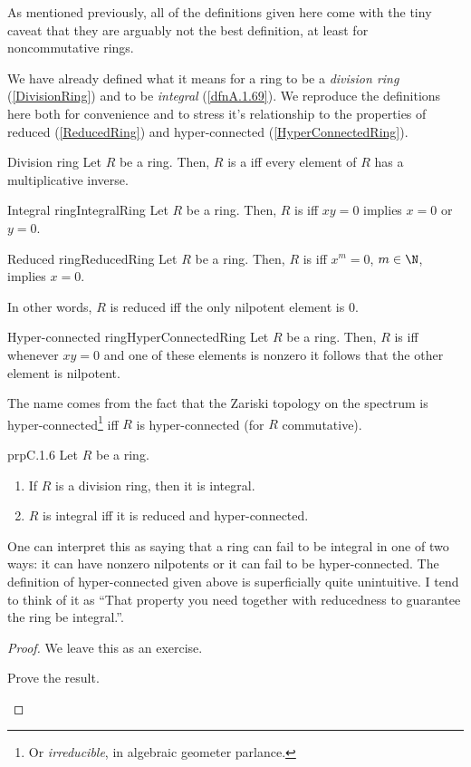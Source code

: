 As mentioned previously, all of the definitions given here come with the tiny caveat that they are arguably not the best definition, at least for noncommutative rings.

We have already defined what it means for a ring to be a \emph{division ring} (\cref{DivisionRing}) and to be \emph{integral} (\cref{dfnA.1.69}).  We reproduce the definitions here both for convenience and to stress it's relationship to the properties of reduced (\cref{ReducedRing}) and hyper-connected (\cref{HyperConnectedRing}).
\begin{dfn}{Division ring}{}
	Let $R$ be a ring.  Then, $R$ is a  iff every element of $R$ has a multiplicative inverse.
\end{dfn}
\begin{dfn}{Integral ring}{IntegralRing}
	Let $R$ be a ring.  Then, $R$ is  iff $xy=0$ implies $x=0$ or $y=0$.
\end{dfn}
\begin{dfn}{Reduced ring}{ReducedRing}
	Let $R$ be a ring.  Then, $R$ is  iff $x^m=0$, $m\in \N$, implies $x=0$.
	\begin{rmk}
		In other words, $R$ is reduced iff the only nilpotent element is $0$.
	\end{rmk}
\end{dfn}
\begin{dfn}{Hyper-connected ring}{HyperConnectedRing}
	Let $R$ be a ring.  Then, $R$ is  iff whenever $xy=0$ and one of these elements is nonzero it follows that the other element is nilpotent.
	\begin{rmk}
		The name comes from the fact that the Zariski topology on the spectrum is hyper-connected\footnote{Or \emph{irreducible}, in algebraic geometer parlance.} iff $R$ is hyper-connected (for $R$ commutative).
	\end{rmk}
\end{dfn}
\begin{prp}{}{prpC.1.6}
	Let $R$ be a ring.
	\begin{enumerate}
		\item \label{prpC.1.6(i)}If $R$ is a division ring, then it is integral.
		\item \label{prpC.1.6(ii)}$R$ is integral iff it is reduced and hyper-connected.
	\end{enumerate}
	\begin{rmk}
		One can interpret this as saying that a ring can fail to be integral in one of two ways:  it can have nonzero nilpotents or it can fail to be hyper-connected.  The definition of hyper-connected given above is superficially quite unintuitive.  I tend to think of it as ``That property you need together with reducedness to guarantee the ring be integral.''.
	\end{rmk}
	\begin{proof}
		We leave this as an exercise.
		\begin{exr}[breakable=false]{}{}
			Prove the result.
		\end{exr}
	\end{proof}
\end{prp}

